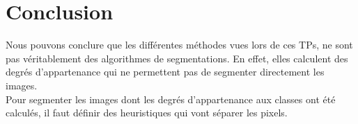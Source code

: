 \documentclass[a4paper,11pt]{article}
\begin{document}
\section*{Conclusion}

Nous pouvons conclure que les différentes méthodes vues lors de ces TPs, ne sont 
pas véritablement des algorithmes de segmentations. En effet, elles calculent 
des degrés d'appartenance qui ne permettent pas de segmenter directement les 
images.\\

Pour segmenter les images dont les degrés d'appartenance aux classes ont été calculés,
il faut définir des heuristiques qui vont séparer les pixels.\\
\end{document}
